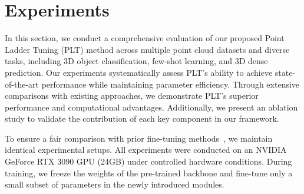 

\section{Experiments}
\label{sec:experiments}


In this section, we conduct a comprehensive evaluation of our proposed Point Ladder Tuning (PLT) method across multiple point cloud datasets  and diverse tasks, including 3D object classification, few-shot learning, and 3D dense prediction. Our experiments systematically assess PLT's ability to achieve state-of-the-art performance while maintaining parameter efficiency. Through extensive comparisons with existing approaches, we demonstrate PLT's superior performance and computational advantages. Additionally, we present an ablation study to validate the contribution of each key component in our framework.

To ensure a fair comparison with prior fine-tuning methods~\cite{zha2023instance, zhou2024dynamic}, we maintain identical experimental setups. All experiments were conducted on an NVIDIA GeForce RTX 3090 GPU (24GB) under controlled hardware conditions. During training, we freeze the weights of the pre-trained backbone and fine-tune only a small subset of parameters in the newly introduced modules.

